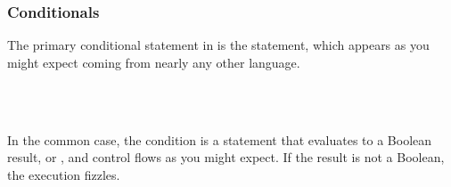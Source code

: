 \subsubsection{Conditionals}

The primary conditional statement in \Prose{} is the  statement,
which appears as you might expect coming from nearly any other language.

\begin{bnf*}
     \\
     \\
\end{bnf*}

In the common case, the condition is a statement that evaluates to a Boolean
result,  or , and control flows as you might expect.
If the result is not a Boolean, the execution fizzles.

\begin{prooftree}
\end{prooftree}
\begin{prooftree}
\end{prooftree}
\begin{prooftree}
\end{prooftree}
\begin{prooftree}
\end{prooftree}
